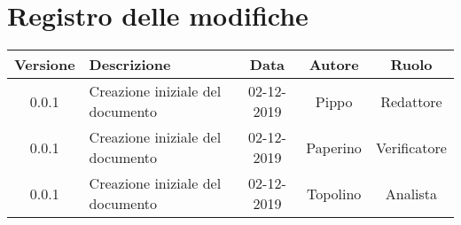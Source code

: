 \section*{Registro delle modifiche}

\begin{center}
	\begin{longtable}{|c|p{5cm}|c|c|c|}
		\hline
		\rowcolor{lighter-grayer}
		\textbf{Versione} & \textbf{Descrizione}             & \textbf{Data} & \textbf{Autore} & \textbf{Ruolo} \\
		\hline
		\endfirsthead


		\hline
		0.0.1             & Creazione iniziale del documento & 02-12-2019    & Pippo           & Redattore      \\
		0.0.1             & Creazione iniziale del documento & 02-12-2019    & Paperino        & Verificatore   \\
		0.0.1             & Creazione iniziale del documento & 02-12-2019    & Topolino        & Analista       \\
		\hline
	\end{longtable}
\end{center}